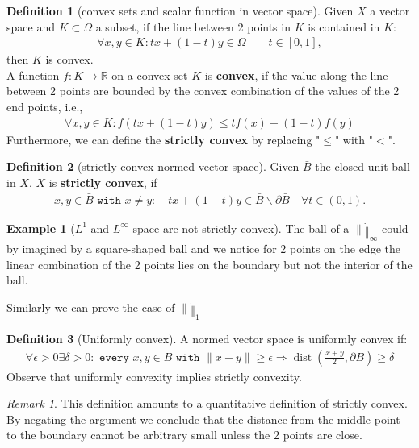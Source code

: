 \documentclass[a4paper,11pt,fleqn]{book}
\theoremstyle{definition}
\newtheorem{definition}{Definition}[section]
\newtheorem*{example}{Example}
\theoremstyle{remark}
\newtheorem*{remark}{Remark}
\DeclareMathOperator*{\dist}{dist}
\begin{document}
\begin{definition}[convex sets and scalar function in vector space]
Given $X$ a vector space and $K \subset \Omega$ a subset, if the line between 2 points in $K$ is contained in $K$:
\begin{align*}
	\forall x, y \in K: tx + (1-t)y \in \Omega \qquad t \in [0, 1],
\end{align*}
then $K$ is convex. \\
A function $f: K \rightarrow \mathbb{R}$ on a convex set $K$ is \textbf{convex}, if the value along the line between 2 points are bounded by the convex combination of the values of the 2 end points, i.e., 
\begin{align*}
	\forall x, y \in K: f(tx + (1-t)y) \leq t f(x) + (1-t) f(y)
\end{align*}
Furthermore, we can define the \textbf{strictly convex} by replacing "$\leq$" with "$<$".	
\end{definition}

\begin{definition}[strictly convex normed vector space]
	Given $\bar{B}$ the closed unit ball in $X$, $X$ is \textbf{strictly convex}, if 
	\begin{align*}
		x, y \in \bar{B} \texttt{ with } x \neq y: \quad t x + (1 - t)y  \in \bar{B} \backslash \partial\bar{B} \quad \forall t \in (0, 1).
	\end{align*}
\end{definition}

\begin{example}[$L^1$ and $L^\infty$ space are not strictly convex]
	The ball of a $\|\dot\|_\infty$ could by imagined by a square-shaped ball and we notice for 2 points on the edge the linear combination of the 2 points lies on the boundary but not the interior of the ball.\par
	Similarly we can prove the case of $\| \dot \|_1$
\end{example}

\begin{definition}[Uniformly convex]
	A normed vector space is uniformly convex if:
	\begin{align*}
		\forall \epsilon >0 \exists \delta >0: \texttt{ every }x, y \in \bar{B}\texttt{ with } \|x - y\| \geq \epsilon \Rightarrow \dist(\frac{x+y}{2}, \partial \bar{B}) \geq \delta
	\end{align*}
	Observe that uniformly convexity implies strictly convexity.
\end{definition}
\begin{remark}
This definition amounts to a quantitative definition of strictly convex. By negating the argument we conclude that the distance from the middle point to the boundary cannot be arbitrary small unless the 2 points are close. 
\end{remark}
\end{document}
